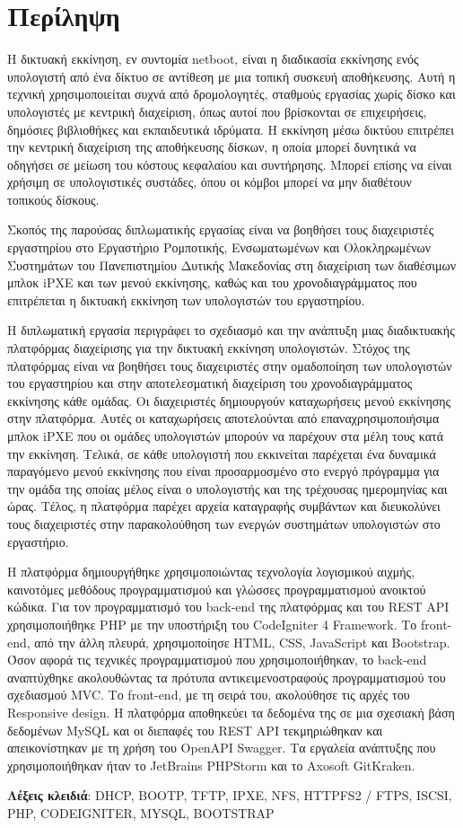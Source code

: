 \chapter*{Περίληψη}
Η δικτυακή εκκίνηση, εν συντομία netboot, είναι η διαδικασία εκκίνησης ενός υπολογιστή από ένα δίκτυο σε αντίθεση με μια τοπική συσκευή αποθήκευσης. Αυτή η τεχνική χρησιμοποιείται συχνά από δρομολογητές, σταθμούς εργασίας χωρίς δίσκο και υπολογιστές με κεντρική διαχείριση, όπως αυτοί που βρίσκονται σε επιχειρήσεις, δημόσιες βιβλιοθήκες και εκπαιδευτικά ιδρύματα. Η εκκίνηση μέσω δικτύου επιτρέπει την κεντρική διαχείριση της αποθήκευσης δίσκων, η οποία μπορεί δυνητικά να οδηγήσει σε μείωση του κόστους κεφαλαίου και συντήρησης. Μπορεί επίσης να είναι χρήσιμη σε υπολογιστικές συστάδες, όπου οι κόμβοι μπορεί να μην διαθέτουν τοπικούς δίσκους.

Σκοπός της παρούσας διπλωματικής εργασίας είναι να βοηθήσει τους διαχειριστές εργαστηρίου στο Εργαστήριο Ρομποτικής, Ενσωματωμένων και Ολοκληρωμένων Συστημάτων του Πανεπιστημίου Δυτικής Μακεδονίας στη διαχείριση των διαθέσιμων μπλοκ iPXE και των μενού εκκίνησης, καθώς και του χρονοδιαγράμματος που επιτρέπεται η δικτυακή εκκίνηση των υπολογιστών του εργαστηρίου.

Η διπλωματική εργασία περιγράφει το σχεδιασμό και την ανάπτυξη μιας διαδικτυακής πλατφόρμας διαχείρισης για την δικτυακή εκκίνηση υπολογιστών. Στόχος της πλατφόρμας είναι να βοηθήσει τους διαχειριστές στην ομαδοποίηση των υπολογιστών του εργαστηρίου και στην αποτελεσματική διαχείριση του χρονοδιαγράμματος εκκίνησης κάθε ομάδας. Οι διαχειριστές δημιουργούν καταχωρήσεις μενού εκκίνησης στην πλατφόρμα. Αυτές οι καταχωρήσεις αποτελούνται από επαναχρησιμοποιήσιμα μπλοκ iPXE που οι ομάδες υπολογιστών μπορούν να παρέχουν στα μέλη τους κατά την εκκίνηση. Τελικά, σε κάθε υπολογιστή που εκκινείται παρέχεται ένα δυναμικά παραγόμενο μενού εκκίνησης που είναι προσαρμοσμένο στο ενεργό πρόγραμμα για την ομάδα της οποίας μέλος είναι ο υπολογιστής και της τρέχουσας ημερομηνίας και ώρας. Τέλος, η πλατφόρμα παρέχει αρχεία καταγραφής συμβάντων και διευκολύνει τους διαχειριστές στην παρακολούθηση των ενεργών συστημάτων υπολογιστών στο εργαστήριο.

Η πλατφόρμα δημιουργήθηκε χρησιμοποιώντας τεχνολογία λογισμικού αιχμής, καινοτόμες μεθόδους προγραμματισμού και γλώσσες προγραμματισμού ανοικτού κώδικα. Για τον προγραμματισμό του back-end της πλατφόρμας και του REST API χρησιμοποιήθηκε PHP με την υποστήριξη του CodeIgniter 4 Framework. Το front-end, από την άλλη πλευρά, χρησιμοποίησε HTML, CSS, JavaScript και Bootstrap. Όσον αφορά τις τεχνικές προγραμματισμού που χρησιμοποιήθηκαν, το back-end αναπτύχθηκε ακολουθώντας τα πρότυπα αντικειμενοστραφούς προγραμματισμού του σχεδιασμού MVC. Το front-end, με τη σειρά του, ακολούθησε τις αρχές του Responsive design. Η πλατφόρμα αποθηκεύει τα δεδομένα της σε μια σχεσιακή βάση δεδομένων MySQL και οι διεπαφές του REST API τεκμηριώθηκαν και απεικονίστηκαν με τη χρήση του OpenAPI Swagger. Τα εργαλεία ανάπτυξης που χρησιμοποιήθηκαν ήταν το JetBrains PHPStorm και το Axosoft GitKraken.

\vfill
\textbf{Λέξεις κλειδιά}: DHCP, BOOTP, TFTP, IPXE, NFS, HTTPFS2 / FTPS, ISCSI, PHP, CODEIGNITER, MYSQL, BOOTSTRAP
